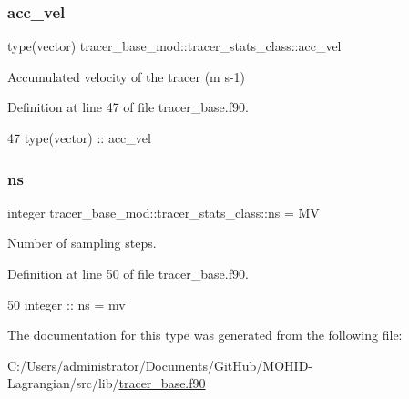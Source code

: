 \subsubsection{\texorpdfstring{acc\+\_\+vel}{acc\_vel}}
{\footnotesize\ttfamily type(vector) tracer\+\_\+base\+\_\+mod\+::tracer\+\_\+stats\+\_\+class\+::acc\+\_\+vel\hspace{0.3cm}{\ttfamily [private]}}



Accumulated velocity of the tracer (m s-\/1) 



Definition at line 47 of file tracer\+\_\+base.\+f90.


\begin{DoxyCode}
47         \textcolor{keywordtype}{type}(vector) :: acc\_vel
\end{DoxyCode}
\mbox{\label{structtracer__base__mod_1_1tracer__stats__class_a5e01cdc2592ecf31711151cf54e3b4d5}} 
\subsubsection{\texorpdfstring{ns}{ns}}
{\footnotesize\ttfamily integer tracer\+\_\+base\+\_\+mod\+::tracer\+\_\+stats\+\_\+class\+::ns = MV\hspace{0.3cm}{\ttfamily [private]}}



Number of sampling steps. 



Definition at line 50 of file tracer\+\_\+base.\+f90.


\begin{DoxyCode}
50         \textcolor{keywordtype}{integer} :: ns = mv                       
\end{DoxyCode}


The documentation for this type was generated from the following file\+:\begin{DoxyCompactItemize}
\item 
C\+:/\+Users/administrator/\+Documents/\+Git\+Hub/\+M\+O\+H\+I\+D-\/\+Lagrangian/src/lib/\mbox{\hyperlink{tracer__base_8f90}{tracer\+\_\+base.\+f90}}\end{DoxyCompactItemize}
